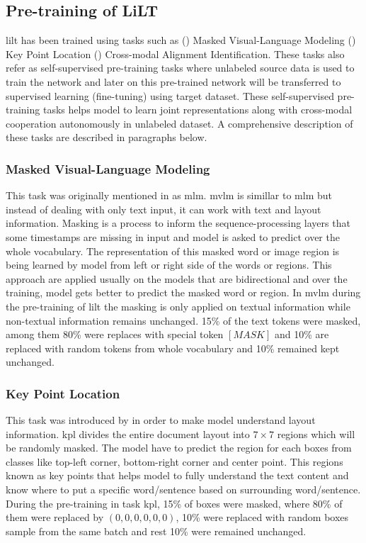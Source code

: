 \subsection{Pre-training of LiLT}

\acrshort{lilt} \cite{wang-etal-2022-lilt} has been trained using tasks such as () Masked Visual-Language Modeling () Key Point Location () Cross-modal Alignment Identification. These tasks also refer as self-supervised pre-training tasks where unlabeled source data is used to train the network and later on this pre-trained network will be transferred to supervised learning (fine-tuning) using target dataset. These self-supervised pre-training tasks helps model to learn joint representations along with cross-modal cooperation autonomously in unlabeled dataset. A comprehensive description of these tasks are described in paragraphs below. 

\subsubsection{Masked Visual-Language Modeling}

This task was originally mentioned in \cite{devlin2018bert} as \acrfull{mlm}. \acrshort{mvlm} is simillar to \acrshort{mlm} but instead of dealing with only text input, it can work with text and layout information.  Masking is a process to inform the sequence-processing layers that some timestamps are missing in input and model is asked to predict over the whole vocabulary. The representation of this masked word or image region is being learned by model from left or right side of the words or regions. This approach are applied usually on the models that are bidirectional and over the training, model gets better to predict the masked word or region. In \acrshort{mvlm} during the pre-training of \acrshort{lilt} the masking is only applied on textual information while non-textual information remains unchanged. 15\% of the text tokens were masked, among them 80\% were replaces with special token $[MASK]$ and 10\% are replaced with random tokens from whole vocabulary and 10\% remained kept unchanged. 

\subsubsection{Key Point Location}
This task was introduced by \cite{wang-etal-2022-lilt} in order to make model understand layout information. \acrshort{kpl} divides the entire document layout into \(7\times7\) regions which will be randomly masked. The model have to predict the region for each boxes from classes like top-left corner, bottom-right corner and center point. This regions known as key points that helps model to fully understand the text content and know where to put a specific word/sentence based on surrounding word/sentence. During the pre-training in task \acrshort{kpl}, 15\% of boxes were masked, where 80\% of them were replaced by \((0,0,0,0,0,0)\), 10\% were replaced with random boxes sample from the same batch and rest 10\% were remained unchanged.

